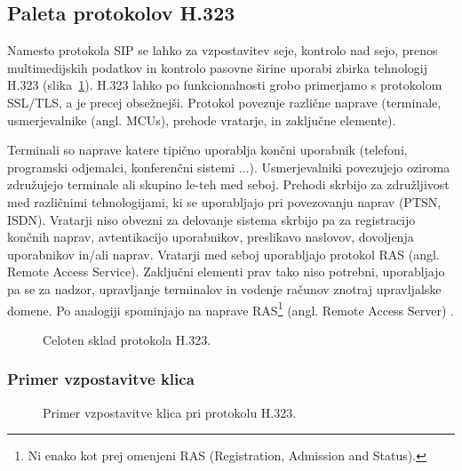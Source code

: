 \documentclass{acm_proc_article-sp}
\begin{document}
\subsection{Paleta protokolov H.323}

Namesto protokola SIP se lahko za vzpostavitev seje, kontrolo nad sejo, prenos multimedijskih podatkov in kontrolo pasovne širine uporabi zbirka tehnologij H.323 (slika~\ref{fig:h323}). H.323 \cite{H323} lahko po funkcionalnosti grobo primerjamo s protokolom SSL/TLS, a je precej obsežnejši. Protokol povezuje različne naprave (terminale, usmerjevalnike (angl. MCUs), prehode vratarje, in zaključne elemente).

Terminali so naprave katere tipično uporablja končni uporabnik (telefoni, programski odjemalci, konferenčni sistemi ...). Usmerjevalniki povezujejo oziroma združujejo terminale ali skupino le-teh med seboj. Prehodi skrbijo za združljivost med različnimi tehnologijami, ki se uporabljajo pri povezovanju naprav (PTSN, ISDN). Vratarji niso obvezni za delovanje sistema skrbijo pa za registracijo končnih naprav, avtentikacijo uporabnikov, preslikavo naslovov, dovoljenja uporabnikov in/ali naprav. Vratarji med seboj uporabljajo protokol RAS (angl. Remote Access Service). Zaključni elementi prav tako niso potrebni, uporabljajo pa se za nadzor, upravljanje terminalov in vodenje računov znotraj upravljalske domene. Po analogiji spominjajo na naprave RAS\footnote{Ni enako kot prej omenjeni RAS (Registration, Admission and Status).} (angl. Remote Access Server) \cite{RAS}.

\begin{figure}
\centering
{} %
\caption{Celoten sklad protokola H.323.}
\label{fig:h323}
\end{figure}



\subsubsection{Primer vzpostavitve klica}

\begin{figure}
\centering
{} %
\caption{Primer vzpostavitve klica pri protokolu H.323.}
\label{fig:h323-call}
\end{figure}
\end{document}
